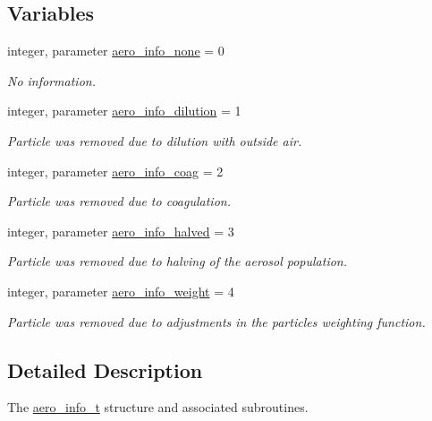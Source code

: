 \subsection*{Variables}
\begin{DoxyCompactItemize}
\item 
integer, parameter \mbox{\hyperlink{namespacepmc__aero__info_ad921514d23f504dc3475f673268bd460}{aero\+\_\+info\+\_\+none}} = 0
\begin{DoxyCompactList}\small\item\em No information. \end{DoxyCompactList}\item 
integer, parameter \mbox{\hyperlink{namespacepmc__aero__info_adf5e66ac6e17ba53b17242778445b6af}{aero\+\_\+info\+\_\+dilution}} = 1
\begin{DoxyCompactList}\small\item\em Particle was removed due to dilution with outside air. \end{DoxyCompactList}\item 
integer, parameter \mbox{\hyperlink{namespacepmc__aero__info_a92cadac9fad64e1c1c5b2878672e1c75}{aero\+\_\+info\+\_\+coag}} = 2
\begin{DoxyCompactList}\small\item\em Particle was removed due to coagulation. \end{DoxyCompactList}\item 
integer, parameter \mbox{\hyperlink{namespacepmc__aero__info_a80aed32f3d631b141971d2566a31ec25}{aero\+\_\+info\+\_\+halved}} = 3
\begin{DoxyCompactList}\small\item\em Particle was removed due to halving of the aerosol population. \end{DoxyCompactList}\item 
integer, parameter \mbox{\hyperlink{namespacepmc__aero__info_a458b6653bdab26796cced7b90c68fbc6}{aero\+\_\+info\+\_\+weight}} = 4
\begin{DoxyCompactList}\small\item\em Particle was removed due to adjustments in the particle\textquotesingle{}s weighting function. \end{DoxyCompactList}\end{DoxyCompactItemize}


\subsection{Detailed Description}
The \mbox{\hyperlink{structpmc__aero__info_1_1aero__info__t}{aero\+\_\+info\+\_\+t}} structure and associated subroutines. 

